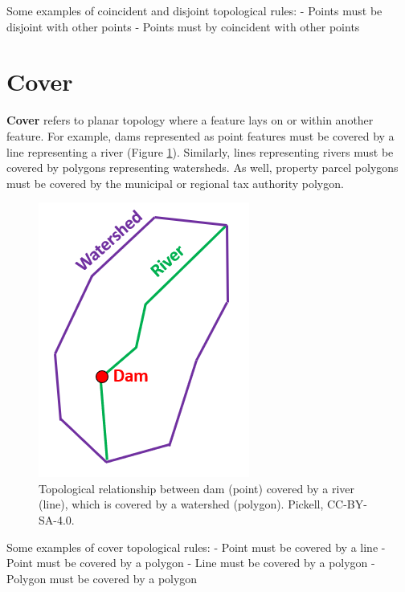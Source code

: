 \documentclass[
]{book}
\begin{document}
Some examples of coincident and disjoint topological rules:
- Points must be disjoint with other points
- Points must by coincident with other points

\hypertarget{cover}{%
\section{Cover}\label{cover}}

\textbf{Cover} refers to planar topology where a feature lays on or within another feature. For example, dams represented as point features must be covered by a line representing a river (Figure \ref{fig:7-dam-river-watershed}). Similarly, lines representing rivers must be covered by polygons representing watersheds. As well, property parcel polygons must be covered by the municipal or regional tax authority polygon.

\begin{figure}
\includegraphics[width=0.75\linewidth]{images/07-dam-river-watershed} \caption{Topological relationship between dam (point) covered by a river (line), which is covered by a watershed (polygon). Pickell, CC-BY-SA-4.0.}\label{fig:7-dam-river-watershed}
\end{figure}

Some examples of cover topological rules:
- Point must be covered by a line
- Point must be covered by a polygon
- Line must be covered by a polygon
- Polygon must be covered by a polygon
\end{document}
